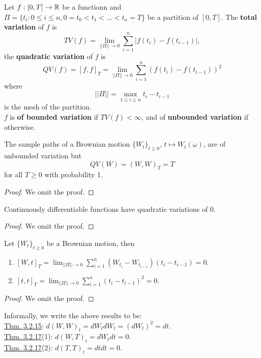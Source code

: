 \documentclass[11pt,fleqn]{book} %
\begin{document}
\begin{definition} \label{def:3214}
Let \(f:[0, T]\rightarrow\mathbb{R}\) be a functionn and \(\Pi = \{t_i: 0 \leq i \leq n, 0 = t_0 < t_1 < \dots < t_n = T\}\) be a partition of \([0, T]\). The \textbf{total variation} of \(f\) is
\[
TV(f) = \lim_{||\Pi|| \rightarrow 0} \sum_{i=1}^n|f(t_i) - f(t_{i-1})|,
\]
the \textbf{quadratic variation} of \(f\) is
\[
QV(f) = [f, f]_T = \lim_{||\Pi||\rightarrow0}\sum_{i=1}^n(f(t_i) - f(t_{i-1}))^2
\]
where
\[
||\Pi|| = \max_{1 \leq i \leq n} t_i - t_{i-1}
\]
is the mesh of the partition. \\
\indent \(f\) is \textbf{of bounded variation} if \(TV(f) < \infty\), and of \textbf{unbounded variation} if otherwise.
\end{definition}

\begin{theorem} \label{thm:3215}
The sample paths of a Brownian motion \(\{W_t\}_{t\geq0}\), \(t \mapsto W_t(\omega)\), are of unbounded variation but
\[
QV(W) = (W, W)_T = T
\]
for all \(T\geq0\) with probability 1.
\end{theorem}
\begin{proof} We omit the proof.\end{proof}

\begin{theorem} \label{thm:3216}
Continuously differentiable functions have quadratic variations of 0.
\end{theorem}
\begin{proof} We omit the proof.\end{proof}

\begin{theorem} \label{thm:3217}
Let \(\{W_t\}_{t\geq0}\) be a Brownian motion, then
\begin{enumerate}
    \item \([W, t]_T = \lim_{||\Pi||\rightarrow0}\sum_{i=1}^n(W_{t_i} - W_{t_{i-1}})(t_i - t_{i-1}) = 0\).
    \item \([t, t]_T = \lim_{||\Pi||\rightarrow0}\sum_{i=1}^n(t_i - t_{i-1})^2 = 0\).    
\end{enumerate}
\end{theorem}
\begin{proof} We omit the proof.\end{proof}

\begin{remark} \label{rmk:3218}
Informally, we write the above results to be:\\
\hyperref[thm:3215]{Thm. 3.2.15}: \(d(W, W)_t = dW_tdW_t = (dW_t)^2 = dt\). \\
\hyperref[thm:3217]{Thm. 3.2.17}(1): \(d(W, T)_t = dW_tdt = 0\). \\
\hyperref[thm:3217]{Thm. 3.2.17}(2): \(d(T, T)_t = dtdt = 0\). \\
\end{remark}
\end{document}

